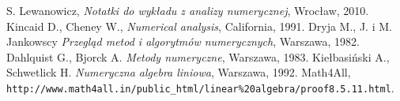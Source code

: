 \begin{thebibliography}{99}
   S. Lewanowicz, {\it Notatki do wykładu z analizy numerycznej}, Wrocław, 2010.
 Kincaid D., Cheney W., {\it Numerical analysis}, California, 1991.
 Dryja M., J. i M. Jankowscy {\it Przegląd metod i algorytmów numerycznych}, Warszawa, 1982.
 Dahlquist G., Bjorck A. {\it Metody numeryczne}, Warszawa, 1983.
 Kiełbasiński A., Schwetlick H. {\it Numeryczna algebra liniowa}, Warszawa, 1992. 
 Math4All, \verb|http://www.math4all.in/public_html/linear%20algebra/proof8.5.11.html|.
\end{thebibliography}

